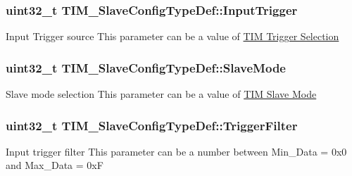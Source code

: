 \subsubsection[{\texorpdfstring{Input\+Trigger}{InputTrigger}}]{\setlength{\rightskip}{0pt plus 5cm}uint32\+\_\+t T\+I\+M\+\_\+\+Slave\+Config\+Type\+Def\+::\+Input\+Trigger}\hypertarget{struct_t_i_m___slave_config_type_def_a82efdad1e2ed9edbd4c895987ebfe0f7}{}\label{struct_t_i_m___slave_config_type_def_a82efdad1e2ed9edbd4c895987ebfe0f7}
Input Trigger source This parameter can be a value of \hyperlink{group___t_i_m___trigger___selection}{T\+IM Trigger Selection} 
\subsubsection[{\texorpdfstring{Slave\+Mode}{SlaveMode}}]{\setlength{\rightskip}{0pt plus 5cm}uint32\+\_\+t T\+I\+M\+\_\+\+Slave\+Config\+Type\+Def\+::\+Slave\+Mode}\hypertarget{struct_t_i_m___slave_config_type_def_a2792de155698128ade1e505618c1bc43}{}\label{struct_t_i_m___slave_config_type_def_a2792de155698128ade1e505618c1bc43}
Slave mode selection This parameter can be a value of \hyperlink{group___t_i_m___slave___mode}{T\+IM Slave Mode} 
\subsubsection[{\texorpdfstring{Trigger\+Filter}{TriggerFilter}}]{\setlength{\rightskip}{0pt plus 5cm}uint32\+\_\+t T\+I\+M\+\_\+\+Slave\+Config\+Type\+Def\+::\+Trigger\+Filter}\hypertarget{struct_t_i_m___slave_config_type_def_a07d28f704576a41e37bbb7412e0fba60}{}\label{struct_t_i_m___slave_config_type_def_a07d28f704576a41e37bbb7412e0fba60}
Input trigger filter This parameter can be a number between Min\+\_\+\+Data = 0x0 and Max\+\_\+\+Data = 0xF 

